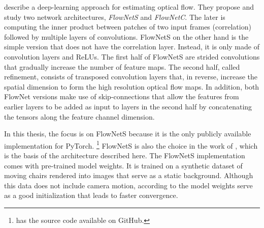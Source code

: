 			\cite{dosovitskiy2015flownet} describe a deep-learning approach for estimating optical flow.
			They propose and study two network architectures, \emph{FlowNetS} and \emph{FlowNetC}.
			The later is computing the inner product between patches of two input frames (correlation) followed by multiple layers of convolutions.
			FlowNetS on the other hand is the simple version that does not have the correlation layer. 
			Instead, it is only made of convolution layers and ReLUs.
			The first half of FlowNetS are strided convolutions that gradually increase the number of feature maps. 
			The second half, called refinement, consists of transposed convolution layers that, in reverse, increase the spatial dimension to form the high resolution optical flow maps.
			In addition, both FlowNet versions make use of skip-connections that allow the features from earlier layers to be added as input to layers in the second half by concatenating the tensors along the feature channel dimension. 
			
			In this thesis, the focus is on FlowNetS because it is the only publicly available implementation for PyTorch.%
			\footnote{\citet*{flownetpytorch} has the source code available on GitHub.}
			FlowNetS is also the choice in the work of \citeauthor{wang2017deepvo}, which is the basis of the architecture described here.
			The FlowNetS implementation comes with pre-trained model weights.
			It is trained on a synthetic dataset of moving chairs rendered into images that serve as a static background.
			Although this data does not include camera motion, according to \mbox{\citeauthor{wang2017deepvo}} the model weights serve as a good initialization that leads to faster convergence. 
			
